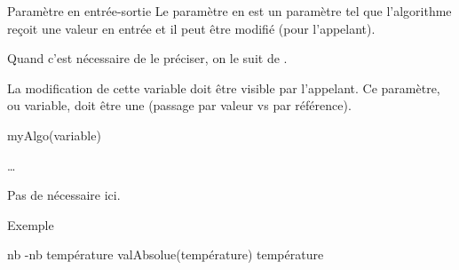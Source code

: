 \begin{hideedit}
\begin{frame}[fragile]{Paramètre en entrée-sortie}
  Le paramètre en  est un paramètre tel que
  l'algorithme reçoit une valeur en entrée et il peut être modifié \pause
  (pour l'appelant).

  Quand c'est nécessaire de le préciser, on le suit de \InOut.

  \pause
  La modification de cette variable doit être visible par l'appelant. Ce
  paramètre, ou variable, doit être une  (passage
  par valeur vs par référence).

  \pause
  \begin{minipage}{4.5cm}
    \begin{pseudocode}
\Stmt myAlgo(variable)
\Empty
    \end{pseudocode}
  \end{minipage}
  \hfill
  \begin{minipage}{7cm}
    \begin{pseudocode}
\Stmt \dots
\EndAlgo
    \end{pseudocode}
  \end{minipage}

  \pause
  Pas de  nécessaire ici.
\end{frame}

\begin{frame}{Exemple}
  \begin{center}
  \end{center}

  \pause
  \begin{pseudocode}[1]
      \pause
        \pause
        \Let nb \Gets -nb
        \pause
      \EndIf
    \EndAlgo
    \Let température 
    \Stmt valAbsolue(température)
    \Write température
    \EndAlgo
  \end{pseudocode}
\end{frame}


\end{hideedit}
